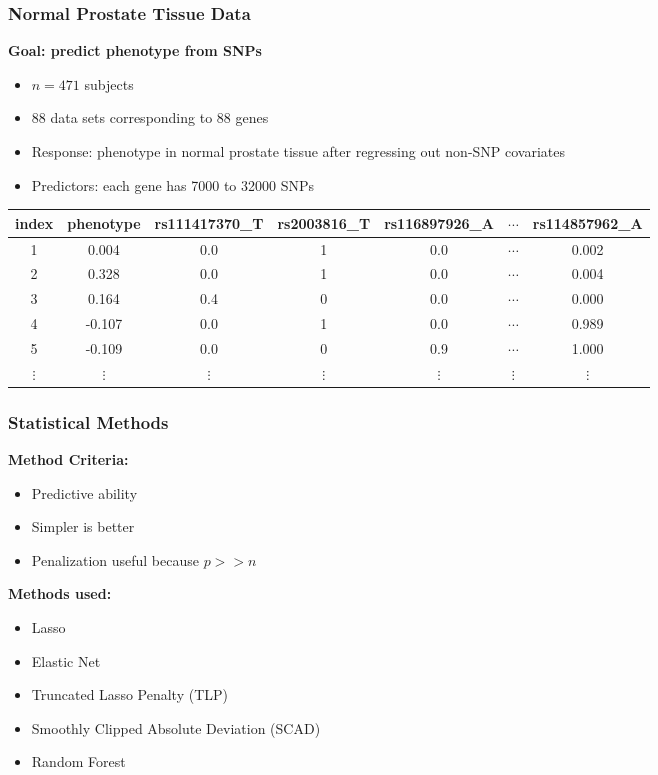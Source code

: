 \documentclass[table]{beamer}
\begin{document}
\begin{frame}
\frametitle{Normal Prostate Tissue Data}
  \textbf{Goal: predict phenotype from SNPs}
\begin{itemize}
  \item $n = 471$ subjects 
  \item 88 data sets corresponding to 88 genes
  \item Response: phenotype in normal prostate tissue after
    regressing out non-SNP covariates
  \item Predictors: each gene has 7000 to 32000 SNPs
\end{itemize}
 \begin{table}[ht]
\centering
    \begin{tabular}{|ccccccc|}
      \hline
        \tiny{index} & \tiny{phenotype} & \tiny{rs111417370\_T} & \tiny{rs2003816\_T} &
         \tiny{rs116897926\_A} &
         $\cdots$ & \tiny{rs114857962\_A} \\
           \hline
         1 &  0.004 & 0.0 & 1 & 0.0 & $\cdots$ & 0.002 \\
         2 &  0.328 & 0.0 & 1 & 0.0 & $\cdots$ & 0.004 \\
         3 &  0.164 & 0.4 & 0 & 0.0 & $\cdots$ & 0.000 \\
         4 & -0.107 & 0.0 & 1 & 0.0 & $\cdots$ & 0.989 \\
         5 & -0.109 & 0.0 & 0 & 0.9 & $\cdots$ & 1.000 \\
      $\vdots$ & $\vdots$ & $\vdots$ & $\vdots$ & $\vdots$ & $\vdots$ & $\vdots$ \\
         \hline
    \end{tabular}
  \end{table}
\end{frame}


\begin{frame}
\frametitle{Statistical Methods}
  \textbf{Method Criteria:}
\begin{itemize}
  \item Predictive ability
  \item Simpler is better
  \item Penalization useful because $p >> n$
\end{itemize}
\textbf{Methods used:} 
\begin{itemize}
  \item Lasso
  \item Elastic Net
  \item Truncated Lasso Penalty (TLP)
  \item Smoothly Clipped Absolute Deviation (SCAD)
  \item Random Forest
\end{itemize}
\end{frame}
\end{document}

